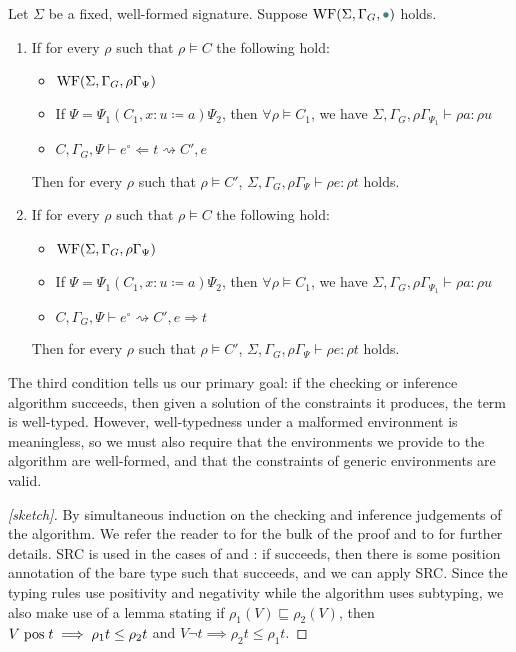 \begin{theorem}
  Let $\Sigma$ be a fixed, well-formed signature.
  Suppose $\WF{\Sigma, \Gamma_G, \mt}$ holds.
  \begin{enumerate}
    \item If for every $\rho$ such that $\rho \vDash C$ the following hold:
      \begin{itemize}
        \item $\textrm{WF}(\Sigma, \Gamma_G, \rho\Gamma_\Psi)$
        \item If $\Psi = \Psi_1 (C_1, x : u \coloneqq a) \Psi_2$, then $\forall \rho \vDash C_1$, we have $\Sigma, \Gamma_G, \rho \Gamma_{\Psi_1} \vdash \rho a : \rho u$
        \item $C, \Gamma_G, \Psi \vdash e^\circ \Leftarrow t \rightsquigarrow C', e$
      \end{itemize}
      Then for every $\rho$ such that $\rho \vDash C'$, $\Sigma, \Gamma_G, \rho\Gamma_\Psi \vdash \rho e : \rho t$ holds.
    \item If for every $\rho$ such that $\rho \vDash C$ the following hold:
      \begin{itemize}
        \item $\textrm{WF}(\Sigma, \Gamma_G, \rho\Gamma_\Psi)$
        \item If $\Psi = \Psi_1 (C_1, x : u \coloneqq a) \Psi_2$, then $\forall \rho \vDash C_1$, we have $\Sigma, \Gamma_G, \rho \Gamma_{\Psi_1} \vdash \rho a : \rho u$
        \item $C, \Gamma_G, \Psi \vdash e^\circ \rightsquigarrow C', e \Rightarrow t$
      \end{itemize}
      Then for every $\rho$ such that $\rho \vDash C'$, $\Sigma, \Gamma_G, \rho\Gamma_\Psi \vdash \rho e : \rho t$ holds.
  \end{enumerate}
\end{theorem}

The third condition tells us our primary goal: if the checking or inference algorithm succeeds, then given a solution of the constraints it produces, the term is well-typed.
However, well-typedness under a malformed environment is meaningless, so we must also require that the environments we provide to the algorithm are well-formed, and that the constraints of generic environments are valid.

\begin{proof}[{[sketch]}]
  By simultaneous induction on the checking and inference judgements of the algorithm.
  We refer the reader to \anotherpdf for the bulk of the proof and to \citet{f-hat, cc-hat-omega} for further details.
  SRC is used in the cases of  and : if \RecCheckLoop succeeds, then there is some position annotation of the bare \cofixpoint type such that \RecCheck succeeds, and we can apply SRC.
  Since the typing rules use positivity and negativity while the algorithm uses subtyping, we also make use of a lemma stating if $\rho_1(V) \sqsubseteq \rho_2(V)$, then $V \mathrel{\text{pos}} t \implies \rho_1 t \leq \rho_2 t$ and $V \neg t \implies \rho_2 t \leq \rho_1 t$.
\end{proof}

